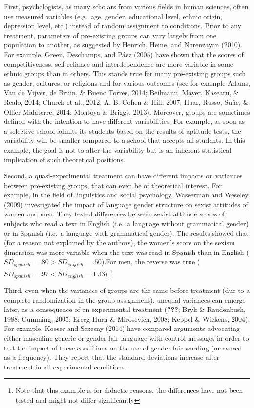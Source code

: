 \documentclass[man,floatsintext]{apa6}
\let\rmarkdownfootnote\footnote%
\def\footnote{\protect\rmarkdownfootnote}
\begin{document}
First, psychologists, as many scholars from various fields in human
sciences, often use measured variables (e.g.~age, gender, educational
level, ethnic origin, depression level, etc.) instead of random
assignment to conditions. Prior to any treatment, parameters of
pre-existing groups can vary largely from one population to another, as
suggested by Henrich, Heine, and Norenzayan (2010). For example, Green,
Deschamps, and Páez (2005) have shown that the scores of
competitiveness, self-reliance and interdependence are more variable in
some ethnic groups than in others. This stands true for many
pre-existing groups such as gender, cultures, or religions and for
various outcomes (see for example Adams, Van de Vijver, de Bruin, \&
Bueno Torres, 2014; Beilmann, Mayer, Kasearu, \& Realo, 2014; Church et
al., 2012; A. B. Cohen \& Hill, 2007; Haar, Russo, Suñe, \&
Ollier-Malaterre, 2014; Montoya \& Briggs, 2013). Moreover, groups are
sometimes defined with the intention to have different variabilities.
For example, as soon as a selective school admits its students based on
the results of aptitude tests, the variability will be smaller compared
to a school that accepts all students. In this example, the goal is not
to alter the variability but is an inherent statistical implication of
such theoretical positions.

Second, a quasi-experimental treatment can have different impacts on
variances between pre-existing groups, that can even be of theoretical
interest. For example, in the field of linguistics and social
psychology, Wasserman and Weseley (2009) investigated the impact of
language gender structure on sexist attitudes of women and men. They
tested differences between sexist attitude scores of subjects who read a
text in English (i.e.~a language without grammatical gender) or in
Spanish (i.e.~a language with grammatical gender). The results showed
that (for a reason not explained by the authors), the women's score on
the sexism dimension was more variable when the text was read in Spanish
than in English (\(SD_{spanish}=.80 > SD_{english}=.50\)).For men, the
reverse was true (\(SD_{spanish}=.97 < SD_{english}=1.33\))
\footnote{Note that this example is for didactic reasons, the differences have not been tested and might not differ significantly}

Third, even when the variances of groups are the same before treatment
(due to a complete randomization in the group assignment), unequal
variances can emerge later, as a consequence of an experimental
treatment ({\textbf{???}}; Bryk \& Raudenbush, 1988; Cumming, 2005;
Erceg-Hurn \& Mirosevich, 2008; Keppel \& Wickens, 2004). For example,
Koeser and Sczesny (2014) have compared arguments advocating either
masculine generic or gender-fair language with control messages in order
to test the impact of these conditions on the use of gender-fair wording
(measured as a frequency). They report that the standard deviations
increase after treatment in all experimental conditions.
\end{document}
